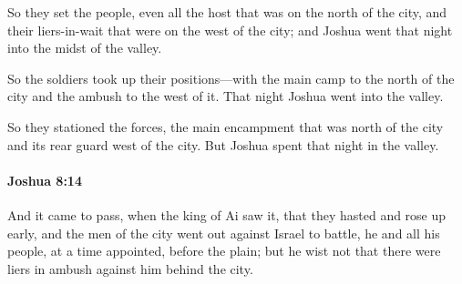 			\begin{versebox}
					\item[BHS] 
					\item[ASV] So they set the people, even all the host that was on the north of the city, and their liers-in-wait that were on the west of the city; and Joshua went that night into the midst of the valley.
					\item[NIV] So the soldiers took up their positions—with the main camp to the north of the city and the ambush to the west of it. That night Joshua went into the valley.
					\item[NRSV] So they stationed the forces, the main encampment that was north of the city and its rear guard west of the city. But Joshua spent that night in the valley.
			\end{versebox}

		\paragraph{Joshua 8:14} %
			\label{JOSHUA-8-14}

			And it came to pass, when the king of Ai saw it, that they hasted and rose up early, and the men of the city went out against Israel to battle, he and all his people, at a time appointed, before the plain; but he wist not that there were liers in ambush against him behind the city.

